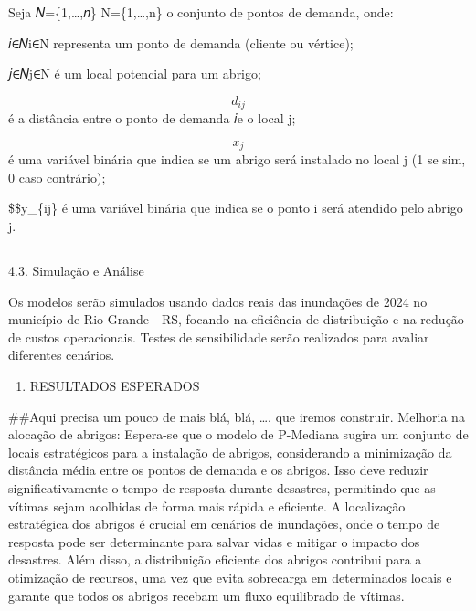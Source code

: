 \documentclass[
]{article}
\providecommand{\tightlist}{%
  \setlength{\itemsep}{0pt}\setlength{\parskip}{0pt}}
\begin{document}
Seja 𝑁=\{1,\ldots,𝑛\} N=\{1,\ldots,n\} o conjunto de pontos de demanda,
onde:

𝑖∈𝑁i∈N representa um ponto de demanda (cliente ou vértice);

𝑗∈𝑁j∈N é um local potencial para um abrigo;

\[d_{ij}\] é a distância entre o ponto de demanda 𝑖e o local j;

\[x_{j}\] é uma variável binária que indica se um abrigo será instalado
no local j (1 se sim, 0 caso contrário);

\$\$y\_\{ij\} é uma variável binária que indica se o ponto i será
atendido pelo abrigo j.

\subsection{}\label{section}

4.3. Simulação e Análise

Os modelos serão simulados usando dados reais das inundações de 2024 no
município de Rio Grande - RS, focando na eficiência de distribuição e na
redução de custos operacionais. Testes de sensibilidade serão realizados
para avaliar diferentes cenários.

\begin{enumerate}
\def\labelenumi{\arabic{enumi}.}
\setcounter{enumi}{4}
\tightlist
\item
  RESULTADOS ESPERADOS
\end{enumerate}

\#\#Aqui precisa um pouco de mais blá, blá, \ldots. que iremos
construir. Melhoria na alocação de abrigos: Espera-se que o modelo de
P-Mediana sugira um conjunto de locais estratégicos para a instalação de
abrigos, considerando a minimização da distância média entre os pontos
de demanda e os abrigos. Isso deve reduzir significativamente o tempo de
resposta durante desastres, permitindo que as vítimas sejam acolhidas de
forma mais rápida e eficiente. A localização estratégica dos abrigos é
crucial em cenários de inundações, onde o tempo de resposta pode ser
determinante para salvar vidas e mitigar o impacto dos desastres. Além
disso, a distribuição eficiente dos abrigos contribui para a otimização
de recursos, uma vez que evita sobrecarga em determinados locais e
garante que todos os abrigos recebam um fluxo equilibrado de vítimas.
\end{document}
